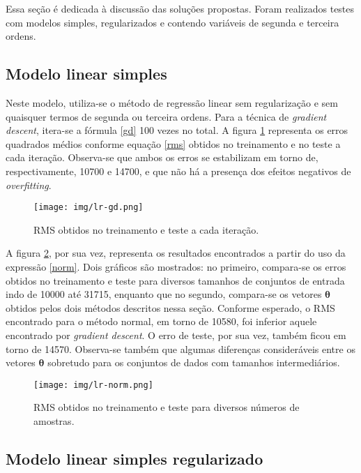 \documentclass[10pt,twocolumn,letterpaper]{article}
\begin{document}
Essa seção é dedicada à discussão das soluções propostas. Foram realizados testes com modelos simples, regularizados e contendo variáveis de segunda e terceira ordens.

\subsection {Modelo linear simples}

Neste modelo, utiliza-se o método de regressão linear sem regularização e sem quaisquer termos de segunda ou terceira ordens. Para a técnica de \textit{gradient descent}, itera-se a fórmula \ref{gd} 100 vezes no total. A figura \ref{fig:lr-gd} representa os erros quadrados médios conforme equação \ref{rms} obtidos no treinamento e no teste a cada iteração. Observa-se que ambos os erros se estabilizam em torno de, respectivamente, 10700 e 14700, e que não há a presença dos efeitos negativos de \textit {overfitting}.

\begin{figure}
    \centering
    \texttt{[image: img/lr-gd.png]}
    \caption{RMS obtidos no treinamento e teste a cada iteração.}
    \label{fig:lr-gd}
\end{figure}

A figura \ref{fig:lr-norm}, por sua vez, representa os resultados encontrados a partir do uso da expressão \ref{norm}. Dois gráficos são mostrados: no primeiro, compara-se os erros obtidos no treinamento e teste para diversos tamanhos de conjuntos de entrada indo de 10000 até 31715, enquanto que no segundo, compara-se os vetores \(\bm{\theta}\) obtidos pelos dois métodos descritos nessa seção. Conforme esperado, o RMS encontrado para o método normal, em torno de 10580, foi inferior aquele encontrado por \textit{gradient descent}. O erro de teste, por sua vez, também ficou em torno de 14570. Observa-se também que algumas diferenças consideráveis entre os vetores \(\bm{\theta}\) sobretudo para os conjuntos de dados com tamanhos intermediários.

\begin{figure}
    \centering
    \texttt{[image: img/lr-norm.png]}
    \caption{RMS obtidos no treinamento e teste para diversos números de amostras.}
    \label{fig:lr-norm}
\end{figure}

\subsection{Modelo linear simples regularizado}
\end{document}

